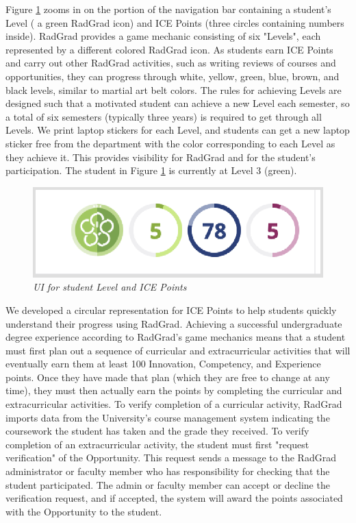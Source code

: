 \documentclass[acmsmall]{acmart}
\begin{document}
Figure \ref{fig:ice} zooms in on the portion of the navigation bar containing a student's Level ( a green RadGrad icon) and ICE Points (three circles containing numbers inside). RadGrad provides a game mechanic consisting of six "Levels", each represented by a different colored RadGrad icon. As students earn ICE Points and carry out other RadGrad activities, such as writing reviews of courses and opportunities, they can progress through white, yellow, green, blue, brown, and black levels, similar to martial art belt colors. The rules for achieving Levels are designed such that a motivated student can achieve a new Level each semester, so a total of six semesters (typically three years) is required to get through all Levels. We print laptop stickers for each Level, and students can get a new laptop sticker free from the department with the color corresponding to each Level as they achieve it. This provides visibility for RadGrad and for the student's participation.  The student in Figure \ref{fig:ice} is currently at Level 3 (green).

\begin{figure}[h]
\centering
\includegraphics[width=\linewidth]{images/ice-points-navbar.png.eps}
\caption{\em UI for student Level and ICE Points}
\label{fig:ice}
\end{figure}

We developed a circular representation for ICE Points to help students quickly understand their progress using RadGrad.  Achieving a successful undergraduate degree experience according to RadGrad's game mechanics means that a student must first plan out a sequence of curricular and extracurricular activities that will eventually earn them at least 100 Innovation, Competency, and Experience points. Once they have made that plan (which they are free to change at any time), they must then actually earn the points by completing the curricular and extracurricular activities. To verify completion of a curricular activity, RadGrad imports data from the University's course management system indicating the coursework the student has taken and the grade they received.  To verify completion of an extracurricular activity, the student must first "request verification" of the Opportunity.  This request sends a message to the RadGrad administrator or faculty member who has responsibility for checking that the student participated. The admin or faculty member can accept or decline the verification request, and if accepted, the system will award the points associated with the Opportunity to the student.
\end{document}
